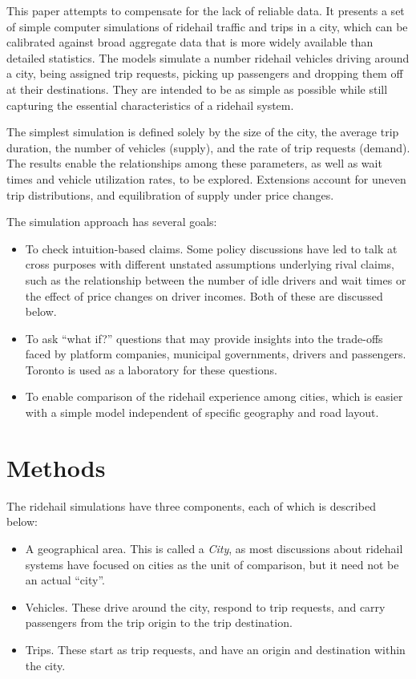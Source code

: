 \documentclass[
  letterpaper,
  DIV=11,
  numbers=noendperiod]{scrartcl}
\begin{document}
This paper attempts to compensate for the lack of reliable data. It
presents a set of simple computer simulations of ridehail traffic and
trips in a city, which can be calibrated against broad aggregate data
that is more widely available than detailed statistics. The models
simulate a number ridehail vehicles driving around a city, being
assigned trip requests, picking up passengers and dropping them off at
their destinations. They are intended to be as simple as possible while
still capturing the essential characteristics of a ridehail system.

The simplest simulation is defined solely by the size of the city, the
average trip duration, the number of vehicles (supply), and the rate of
trip requests (demand). The results enable the relationships among these
parameters, as well as wait times and vehicle utilization rates, to be
explored. Extensions account for uneven trip distributions, and
equilibration of supply under price changes.

The simulation approach has several goals:

\begin{itemize}
\item
  To check intuition-based claims. Some policy discussions have led to
  talk at cross purposes with different unstated assumptions underlying
  rival claims, such as the relationship between the number of idle
  drivers and wait times or the effect of price changes on driver
  incomes. Both of these are discussed below.
\item
  To ask ``what if?'' questions that may provide insights into the
  trade-offs faced by platform companies, municipal governments, drivers
  and passengers. Toronto is used as a laboratory for these questions.
\item
  To enable comparison of the ridehail experience among cities, which is
  easier with a simple model independent of specific geography and road
  layout.
\end{itemize}

\hypertarget{methods}{%
\section{Methods}\label{methods}}

The ridehail simulations have three components, each of which is
described below:

\begin{itemize}
\item
  A geographical area. This is called a \emph{City}, as most discussions
  about ridehail systems have focused on cities as the unit of
  comparison, but it need not be an actual ``city''.
\item
  Vehicles. These drive around the city, respond to trip requests, and
  carry passengers from the trip origin to the trip destination.
\item
  Trips. These start as trip requests, and have an origin and
  destination within the city.
\end{itemize}
\end{document}
